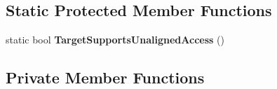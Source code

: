 \subsection*{Static Protected Member Functions}
\begin{DoxyCompactItemize}
\item 
static bool {\bfseries Target\+Supports\+Unaligned\+Access} ()\hypertarget{classv8_1_1internal_1_1interpreter_1_1_interpreter_assembler_a8b97c8eafb206f82d81699d4d9a2577a}{}\label{classv8_1_1internal_1_1interpreter_1_1_interpreter_assembler_a8b97c8eafb206f82d81699d4d9a2577a}

\end{DoxyCompactItemize}
\subsection*{Private Member Functions}
